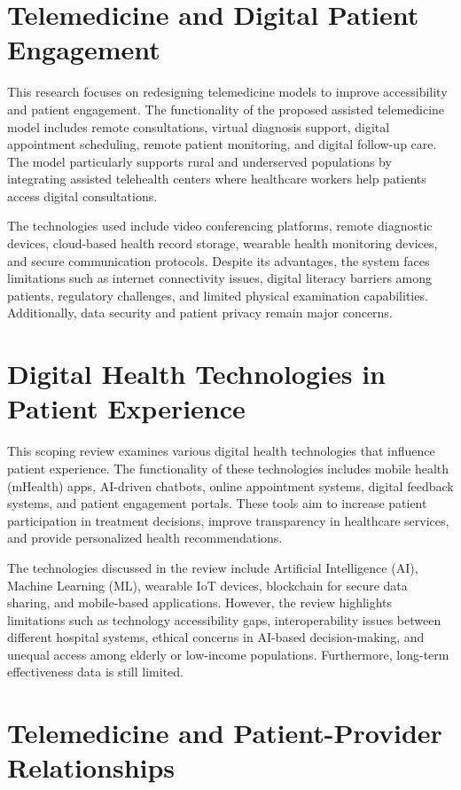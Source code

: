 \section{Telemedicine and Digital Patient Engagement}

This research focuses on redesigning telemedicine models to improve accessibility and patient engagement. The functionality of the proposed assisted telemedicine model includes remote consultations, virtual diagnosis support, digital appointment scheduling, remote patient monitoring, and digital follow-up care. The model particularly supports rural and underserved populations by integrating assisted telehealth centers where healthcare workers help patients access digital consultations.
 
\noindent
The technologies used include video conferencing platforms, remote diagnostic devices, cloud-based health record storage, wearable health monitoring devices, and secure communication protocols. Despite its advantages, the system faces limitations such as internet connectivity issues, digital literacy barriers among patients, regulatory challenges, and limited physical examination capabilities. Additionally, data security and patient privacy remain major concerns.
\section{Digital Health Technologies in Patient Experience}

This scoping review examines various digital health technologies that influence patient experience. The functionality of these technologies includes mobile health (mHealth) apps, AI-driven chatbots, online appointment systems, digital feedback systems, and patient engagement portals. These tools aim to increase patient participation in treatment decisions, improve transparency in healthcare services, and provide personalized health recommendations.

\noindent
The technologies discussed in the review include Artificial Intelligence (AI), Machine Learning (ML), wearable IoT devices, blockchain for secure data sharing, and mobile-based applications. However, the review highlights limitations such as technology accessibility gaps, interoperability issues between different hospital systems, ethical concerns in AI-based decision-making, and unequal access among elderly or low-income populations. Furthermore, long-term effectiveness data is still limited.
\section{Telemedicine and Patient-Provider Relationships}


